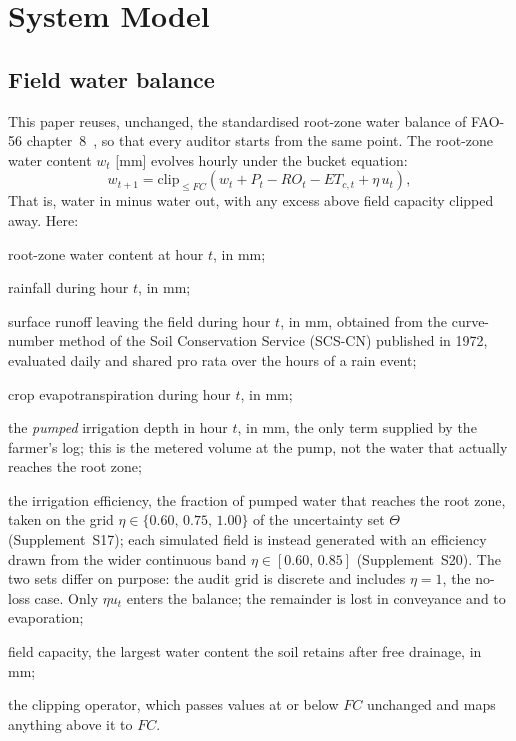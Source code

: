 \section{System Model}
\label{sec:model}

\subsection{Field water balance}

This paper reuses, unchanged, the standardised root-zone water balance of FAO-56
chapter~8~\cite{fao56}, so that every auditor starts from the same point. The root-zone
water content $w_t$ [mm] evolves hourly under the bucket equation:
\begin{equation}
w_{t+1}=\mathrm{clip}_{\le FC}\!\left(w_t+P_t-RO_t-ET_{c,t}+\eta\,u_t\right),
\label{eq:bucket}
\end{equation}
That is, water in minus water out, with any excess above field capacity clipped
away. Here:
\begin{symbolist}
\item[$w_t$] root-zone water content at hour $t$, in mm;
\item[$P_t$] rainfall during hour $t$, in mm;
\item[$RO_t$] surface runoff leaving the field during hour $t$, in mm, obtained
  from the curve-number method of the Soil Conservation Service (SCS-CN) published
  in 1972, evaluated daily and shared pro rata over the hours of a rain event;
\item[$ET_{c,t}$] crop evapotranspiration during hour $t$, in mm;
\item[$u_t$] the \emph{pumped} irrigation depth in hour $t$, in mm, the only term
  supplied by the farmer's log; this is the metered volume at the pump, not the
  water that actually reaches the root zone;
\item[$\eta$] the irrigation efficiency, the fraction of pumped water that
  reaches the root zone, taken on the grid $\eta\in\{0.60,\,0.75,\,1.00\}$ of the
  uncertainty set $\Theta$ (Supplement~S17); each simulated field is instead
  generated with an efficiency drawn from the wider continuous band
  $\eta\in[0.60,\,0.85]$ (Supplement~S20). The two sets differ on purpose: the
  audit grid is discrete and includes $\eta=1$, the no-loss case. Only
  $\eta u_t$ enters the balance; the remainder is lost in conveyance and to
  evaporation;
\item[$FC$] field capacity, the largest water content the soil retains after free
  drainage, in mm;
\item[$\mathrm{clip}_{\le FC}$] the clipping operator, which passes values at or
  below $FC$ unchanged and maps anything above it to $FC$.
\end{symbolist}

